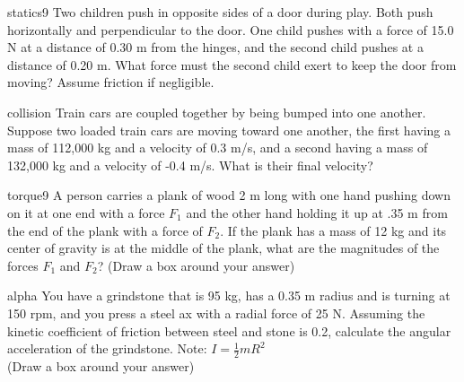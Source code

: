 \documentclass[letterpaper]{article}
\begin{document}
{\begin{question}{statics9}
  Two children push in opposite sides of a door during play. Both push
  horizontally and perpendicular to the door. One child pushes with a
  force of 15.0 N at a distance of 0.30 m from the hinges, and the
  second child pushes at a distance of 0.20 m.  What force must the
  second child exert to keep the door from moving? Assume friction if
  negligible.
\begin{choices}
\end{choices}
\end{question}

\begin{question}{collision}
  Train cars are coupled together by being bumped into one
  another. Suppose two loaded train cars are moving toward one
  another, the first having a mass of 112,000 kg and a velocity of 0.3
  m/s, and a second having a mass of 132,000 kg and a velocity of -0.4
  m/s. What is their final velocity?
\begin{choices}
\end{choices}
\end{question}

\begin{question}{torque9}
  A person carries a plank of wood 2 m long with one hand pushing down
  on it at one end with a force $F_1$ and the other hand holding it up
  at .35 m from the end of the plank with a force of $F_2$. If the
  plank has a mass of 12 kg and its center of gravity is at the
  middle of the plank, what are the magnitudes of the forces $F_1$ and
  $F_2$?  (Draw a box around your answer)
\end{question}

\begin{question}{alpha }
  You have a grindstone that is 95 kg, has a 0.35 m radius and is
  turning at 150 rpm, and you press a steel ax with a radial force of
  25 N.  Assuming the kinetic coefficient of friction between steel
  and stone is 0.2, calculate the angular acceleration of the
  grindstone. Note: $I=\frac{1}{2}mR^2$ \\ (Draw a box around your answer)
\end{question}

}
\end{document}
